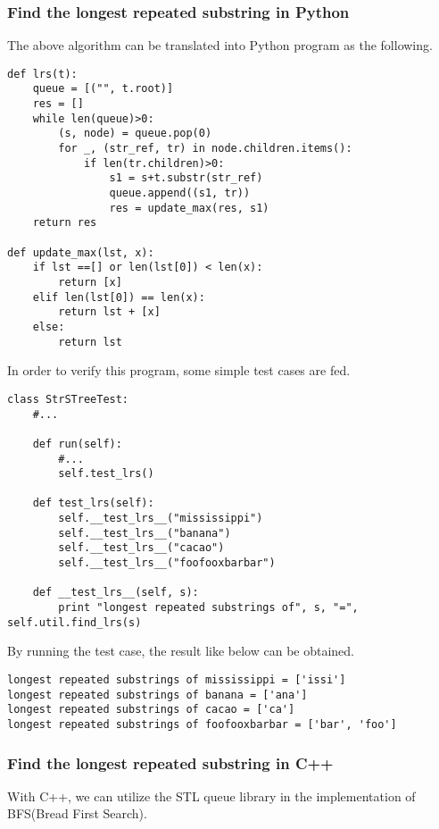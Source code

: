 \documentclass{article}
\begin{document}
\subsubsection*{Find the longest repeated substring in Python}
The above algorithm can be translated into Python program as the following.

\lstset{language=Python}
\begin{lstlisting}
def lrs(t):
    queue = [("", t.root)]
    res = []
    while len(queue)>0:
        (s, node) = queue.pop(0)
        for _, (str_ref, tr) in node.children.items():
            if len(tr.children)>0:
                s1 = s+t.substr(str_ref)
                queue.append((s1, tr))
                res = update_max(res, s1)
    return res

def update_max(lst, x):
    if lst ==[] or len(lst[0]) < len(x):
        return [x]
    elif len(lst[0]) == len(x):
        return lst + [x]
    else:
        return lst
\end{lstlisting}

In order to verify this program, some simple test cases are fed.

\begin{lstlisting}
class StrSTreeTest:
    #...

    def run(self):
        #...
        self.test_lrs()

    def test_lrs(self):
        self.__test_lrs__("mississippi")
        self.__test_lrs__("banana")
        self.__test_lrs__("cacao")
        self.__test_lrs__("foofooxbarbar")

    def __test_lrs__(self, s):
        print "longest repeated substrings of", s, "=", self.util.find_lrs(s)
\end{lstlisting}

By running the test case, the result like below can be obtained.

\begin{verbatim}
longest repeated substrings of mississippi = ['issi']
longest repeated substrings of banana = ['ana']
longest repeated substrings of cacao = ['ca']
longest repeated substrings of foofooxbarbar = ['bar', 'foo']
\end{verbatim}

\subsubsection*{Find the longest repeated substring in C++}
With C++, we can utilize the STL queue library in the implementation
of BFS(Bread First Search). 
\end{document}
